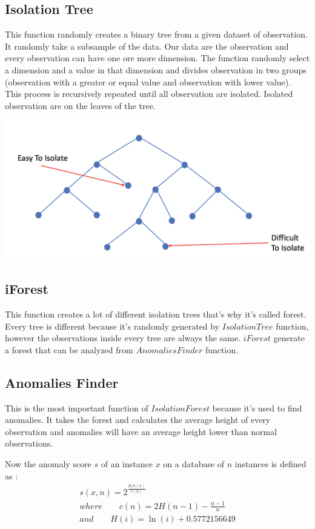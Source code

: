 \documentclass[journal]{IEEEtran}
\begin{document}
\subsection{Isolation Tree}
This function randomly creates a binary tree from a given dataset of observation. It randomly take a subsample of the data. Our data are the observation and every observation can have one ore more dimension.
The function randomly select a dimension and a value in that dimension and divides observation in two groups (observation with a greater or equal value and observation with lower value). This process is recursively repeated until all observation are isolated. Isolated observation are on the leaves of the tree.

\begin{center}
\includegraphics[width=\columnwidth]{albero.png}
\end{center}

\subsection{iForest}
This function creates a lot of different isolation trees that's why it’s called forest. Every tree is different because it’s randomly generated by $IsolationTree$ function, however the observations inside every tree are always the same. $iForest$ generate a forest that can be analyzed from $Anomalies Finder$ function.

\subsection{Anomalies Finder}
This is the most important function of $Isolation Forest$ because it’s used to find anomalies. It takes the forest and calculates the average height of every observation  and anomalies will have an average height lower than normal observations.

Now the anomaly score $s$ of an instance $x$ on a database of $n$ instances is defined as :
\begin{gather*}
s(x,n)=2^{\frac{E(h(x)}{c(n)}} \\
where \qquad c(n)=2H(n - 1) - \frac{n - 1}{n} \\
and \qquad H(i)=\ln (i) + 0.5772156649
\end{gather*}
\end{document}

